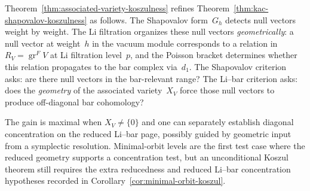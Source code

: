 \begin{remark}
\label{rem:li-bar-vs-kac-shapovalov}

Theorem~\ref{thm:associated-variety-koszulness} refines
Theorem~\ref{thm:kac-shapovalov-koszulness} as follows.
The Shapovalov form~$G_h$ detects null vectors weight by weight.
The Li filtration organizes these null vectors \emph{geometrically}:
a null vector at weight~$h$ in the vacuum module corresponds
to a relation in $R_V = \operatorname{gr}^F V$ at Li
filtration level~$p$, and the Poisson bracket determines
whether this relation propagates to the bar complex via~$d_1$.
The Shapovalov criterion asks: are there null vectors in the
bar-relevant range? The Li--bar criterion asks: does the
\emph{geometry} of the associated variety~$X_V$ force those
null vectors to produce off-diagonal bar cohomology?

The gain is maximal when $X_V \neq \{0\}$ and one can
separately establish diagonal concentration on the reduced
Li--bar page, possibly guided by geometric input from a
symplectic resolution. Minimal-orbit levels are the first
test case where the reduced geometry supports a concentration test, but
an unconditional Koszul theorem still requires the extra
reducedness and reduced Li--bar concentration hypotheses recorded in
Corollary~\ref{cor:minimal-orbit-koszul}.
\end{remark}

